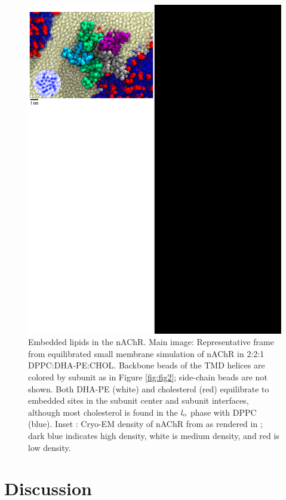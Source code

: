 	\begin{figure}[h!]
		\includegraphics[width=1\linewidth]{ModelMemb_Images/Summary.pdf}
		\caption[Embedded lipids in the nAChR.] {Embedded lipids in the nAChR. Main image: Representative frame from equilibrated small membrane simulation of nAChR in 2:2:1 DPPC:DHA-PE:CHOL. Backbone beads of the TMD helices are colored by subunit as in Figure \ref{fig:fig2}; side-chain beads are not shown.  Both DHA-PE (white) and cholesterol (red) equilibrate to embedded sites in the subunit center and subunit interfaces, although most cholesterol is found in the $l_{\mathrm{o}}$ phase with DPPC (blue). Inset : Cryo-EM density of nAChR from \citep{Miyazawa2003} as rendered in \citep{Brannigan2008}; dark blue indicates high density, white is medium density, and red is low density. }
		\label{fig:sum}
	\end{figure}

	 
 \section{Discussion}
\label{S:4}

